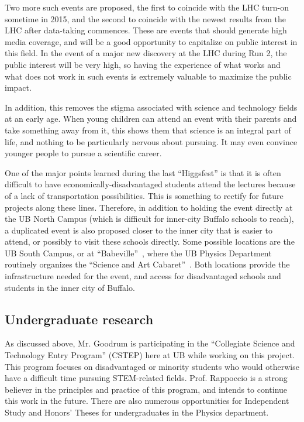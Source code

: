 \documentclass[times,11pt]{article}
\begin{document}
Two more such events are proposed, the first to coincide with the LHC
turn-on sometime in 2015, and the second to coincide with the newest
results from the LHC after data-taking commences. These are 
events that should generate high media coverage, and will be a good
opportunity to capitalize on public interest in this field.
In the event of a major new discovery at the LHC
during Run 2, the public interest will be very high, so having the
experience of what works and what does not work in such events is
extremely valuable to maximize the public impact. 

In addition, this removes the stigma associated with science and
technology fields at an early age. When young children can attend an
event with their parents and take something away from it, this shows
them that science is an integral part of life, and nothing to be
particularly nervous about pursuing. It may even convince younger
people to pursue a scientific career. 

One of the major points learned during the last ``Higgsfest''
is that it is often difficult to have economically-disadvantaged
students attend the lectures because of a lack of transportation
possibilities. This is something to rectify for future
projects along these lines. Therefore, in addition to holding the
event directly
at the UB North Campus (which is difficult for inner-city
Buffalo schools to reach), a duplicated event is also proposed
closer to the inner city that is easier to attend, or possibly to
visit these schools directly. Some possible
locations are the UB South Campus, or at
``Babeville''~\cite{babeville}, where the UB Physics
Department routinely organizes the ``Science and Art
Cabaret''~\cite{cabaret}. Both locations 
provide the infrastructure needed for the event, and
access for disadvantaged schools and students in the inner city of
Buffalo. 




\subsection{Undergraduate research}

As discussed above, Mr. Goodrum is participating in the
``Collegiate Science and Technology Entry Program'' (CSTEP) here at
UB while working on this project. This program focuses on
disadvantaged or minority students who would otherwise have a
difficult time pursuing STEM-related fields. Prof. Rappoccio is a
strong believer in the principles and practice of this program, and
intends to continue this work in the future. 
There are also numerous opportunities for Independent Study and
Honors' Theses for undergraduates in the Physics department. 
\end{document}
